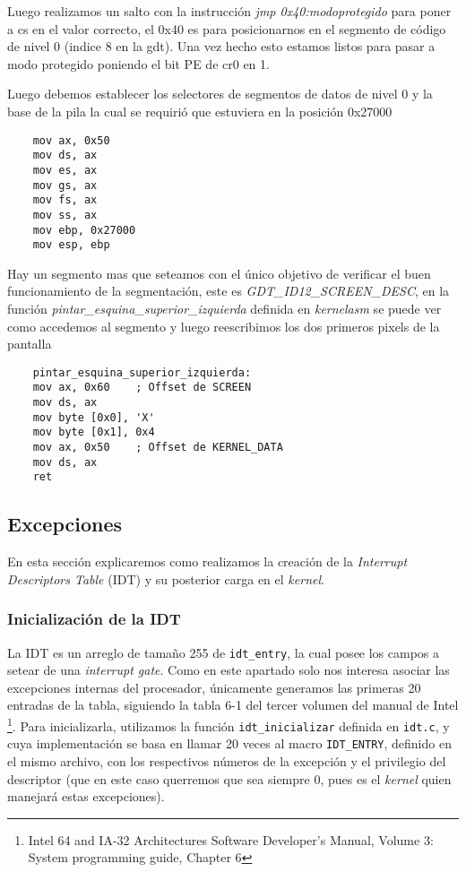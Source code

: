 Luego realizamos un salto con la instrucción \textit{jmp 0x40:modoprotegido} para poner a cs en el valor correcto, el 0x40 es para posicionarnos en el segmento de código de nivel 0 (indice 8 en la gdt). Una vez hecho esto estamos listos para pasar a modo protegido poniendo el bit PE de cr0 en 1. 

Luego debemos establecer los selectores de segmentos de datos de nivel 0 y la base de la pila la cual se requirió que estuviera en la posición 0x27000

\begin{lstlisting}
	mov ax, 0x50	
	mov ds, ax
	mov es, ax
	mov gs, ax
	mov fs, ax
	mov ss, ax
	mov ebp, 0x27000
	mov esp, ebp
\end{lstlisting}

Hay un segmento mas que seteamos con el único objetivo de verificar el buen funcionamiento de la segmentación, este es \textit{GDT\_ID12\_SCREEN\_DESC}, en la función \textit{pintar\_esquina\_superior\_izquierda} definida en \textit{kernelasm} se puede ver como accedemos al segmento y luego reescribimos los dos primeros pixels de la pantalla

\begin{lstlisting}
	pintar_esquina_superior_izquierda:
	mov ax, 0x60	; Offset de SCREEN
	mov ds, ax
	mov byte [0x0], 'X'
	mov byte [0x1], 0x4
	mov ax, 0x50	; Offset de KERNEL_DATA
	mov ds, ax
	ret	
\end{lstlisting}

\subsection{Excepciones}
\label{subsec:excepciones}
En esta sección explicaremos como realizamos la creación de la \textit{Interrupt Descriptors Table} (IDT) y su posterior carga en el \textit{kernel}.

\subsubsection{Inicialización de la IDT}
La IDT es un arreglo de tamaño 255 de \texttt{idt\_entry}, la cual posee los campos a setear de una \textit{interrupt gate}. Como en este apartado solo nos interesa asociar las excepciones internas del procesador, únicamente generamos las primeras 20 entradas de la tabla, siguiendo la tabla 6-1 del tercer volumen del manual de Intel \footnote{Intel 64 and IA-32 Architectures Software Developer's Manual, Volume 3: System programming guide, Chapter 6}. Para inicializarla, utilizamos la función \texttt{idt\_inicializar} definida en \texttt{idt.c}, y cuya implementación se basa en llamar 20 veces al macro \texttt{IDT\_ENTRY}, definido en el mismo archivo, con los respectivos números de la excepción y el privilegio del descriptor (que en este caso querremos que sea siempre 0, pues es el \textit{kernel} quien manejará estas excepciones).

